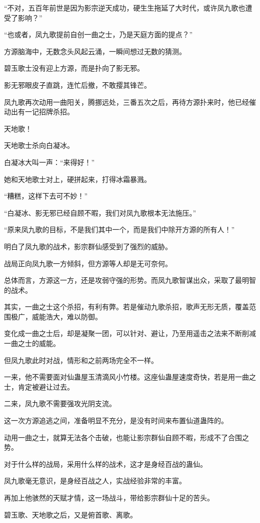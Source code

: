 \begin{this_body}
“不对，五百年前世是因为影宗逆天成功，硬生生拖延了大时代，或许凤九歌也遭受了影响？”

“也或者，凤九歌提前自创一曲之士，乃是天庭方面的提点？”

方源脑海中，无数念头风起云涌，一瞬间想过无数的猜测。

碧玉歌士没有迎上方源，而是扑向了影无邪。

影无邪眼皮子直跳，连忙后撤，不敢撄其锋芒。

凤九歌再次动用一曲阳关，腾挪远处，三番五次之后，再待方源扑来时，他已经催动出有一记招牌杀招。

天地歌！

天地歌士杀向白凝冰。

白凝冰大叫一声：“来得好！”

她和天地歌士对上，硬拼起来，打得冰霜暴溅。

“糟糕，这样下去可不妙！”

“白凝冰、影无邪已经自顾不暇，我们对凤九歌根本无法施压。”

“原来凤九歌的目标，不是我们其中一个，而是我们中除开方源的所有人！”

明白了凤九歌的战术，影宗群仙感受到了强烈的威胁。

战局正向凤九歌一方倾斜，但方源等人却是无可奈何。

总体而言，方源这一方，还是攻弱守强的形势。而凤九歌智谋出众，采取了最明智的战术。

其实，一曲之士这个杀招，有利有弊。若是催动九歌杀招，歌声无形无质，覆盖范围极广，威能浩大，难以防御。

变化成一曲之士后，却是凝聚一团，可以针对、避让，乃至用遥击之法来不断削减一曲之士的威能。

但凤九歌此时对战，情形和之前两场完全不一样。

一来，他不需要面对仙蛊屋玉清滴风小竹楼。这座仙蛊屋速度奇快，若是用一曲之士，肯定被避让过去。

二来，凤九歌不需要强攻光阴支流。

这一次方源追逃之间，准备明显不充分，是没有时间来布置仙道蛊阵的。

动用一曲之士，就算无法各个击破，也能让影宗群仙自顾不暇，形成不了合围之势。

对于什么样的战局，采用什么样的战术，这才是身经百战的蛊仙。

凤九歌毫无意识，是身经百战之人，实战经验非常的丰富。

再加上他骇然的天赋才情，这一场战斗，带给影宗群仙十足的苦头。

碧玉歌、天地歌之后，又是俯首歌、离歌。


\end{this_body}
